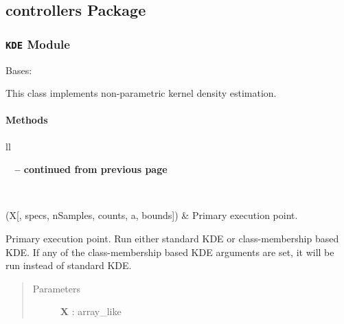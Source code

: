 \documentclass[letterpaper,10pt,english]{sphinxmanual}
\begin{document}
\subsection{controllers Package}
\label{qikify.controllers::doc}\label{qikify.controllers:controllers-package}

\subsubsection{\texttt{KDE} Module}
\label{qikify.controllers:module-qikify.controllers.KDE}\label{qikify.controllers:kde-module}

\begin{fulllineitems}
\label{qikify.controllers:qikify.controllers.KDE.KDE}
Bases: 

This class implements non-parametric kernel density estimation.
\paragraph{Methods}

\begin{longtable}{ll}
\hline
\endfirsthead

%
{{\bfseries \tablename\ \thetable{} -- continued from previous page}} \\
\hline
\endhead

\hline {} \\ \hline
\endfoot

\hline
\endlastfoot


{\hyperref[qikify.controllers:qikify.controllers.KDE.KDE.run]{}}(X{[}, specs, nSamples, counts, a, bounds{]})
 & 
Primary execution point.
\\\hline
\end{longtable}


\begin{fulllineitems}
\label{qikify.controllers:qikify.controllers.KDE.KDE.run}
Primary execution point. Run either standard KDE or class-membership based KDE. If 
any of the class-membership based KDE arguments are set, it will be run instead of 
standard KDE.
\begin{quote}\begin{description}
\item[{Parameters }] \leavevmode
\textbf{X} : array\_like
\begin{quote}


\end{quote}
\end{description}
\end{quote}
\end{fulllineitems}
\end{fulllineitems}
\end{document}
